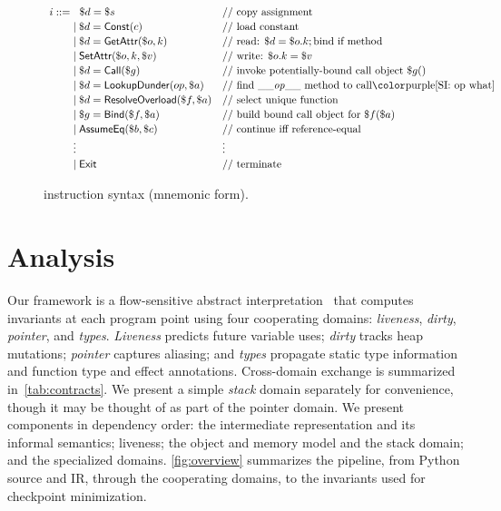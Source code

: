
\begin{figure}[t]
\centering
\[
\renewcommand{\arraystretch}{1.15}
\begin{array}{l@{}ll}
i ::= \;&\hspace{6pt} \$d = \$s & \text{// copy assignment} \\
      &\mid \$d = \mathsf{Const}(c) & \text{// load constant} \\
      &\mid \$d = \mathsf{GetAttr}(\$o, k) & \text{// read: } \$d = \$o.k; \text{bind if method} \\
      &\mid \mathsf{SetAttr}(\$o, k, \$v) & \text{// write: } \$o.k = \$v \\
      &\mid \$d = \mathsf{Call}(\$g) & \text{// invoke potentially-bound call object } \$g() \\
      &\mid \$d = \mathsf{LookupDunder}(op, \$a)  & \text{// find \_\_\textit{op}\_\_ method to call\si{op what}} \\
      &\mid \$d = \mathsf{ResolveOverload}(\$f, \$a) & \text{// select unique function} \\
      &\mid \$g = \mathsf{Bind}(\$f, \$a) & \text{// build bound call object for } \$f(\$a) \\
      &\mid \mathsf{AssumeEq}(\$b, \$c) & \text{// continue iff reference-equal} \\
      & \vdots & \vdots \\
      &\mid \mathsf{Exit} & \text{// terminate}
\end{array}
\]
\caption{\spytecode instruction syntax (mnemonic form).}
\label{fig:tac-syntax-reduced}
\end{figure}

\section{Analysis}
\label{sec:analysis}

Our framework is a flow-sensitive abstract interpretation~\cite{cousot1977abstract} that computes invariants at each program point using four cooperating domains: \emph{liveness}, \emph{dirty}, \emph{pointer}, and \emph{types}. \emph{Liveness} predicts future variable uses; \emph{dirty} tracks heap mutations; \emph{pointer} captures aliasing; and \emph{types} propagate static type information and function type and effect annotations. Cross-domain exchange is summarized in~\autoref{tab:contracts}. We present a simple \emph{stack} domain separately for convenience, though it may be thought of as part of the pointer domain. We present components in dependency order: the intermediate representation and its informal semantics; liveness; the object and memory model and the stack domain; and the specialized domains. \autoref{fig:overview} summarizes the pipeline, from Python source and IR, through the cooperating domains, to the invariants used for checkpoint minimization.

